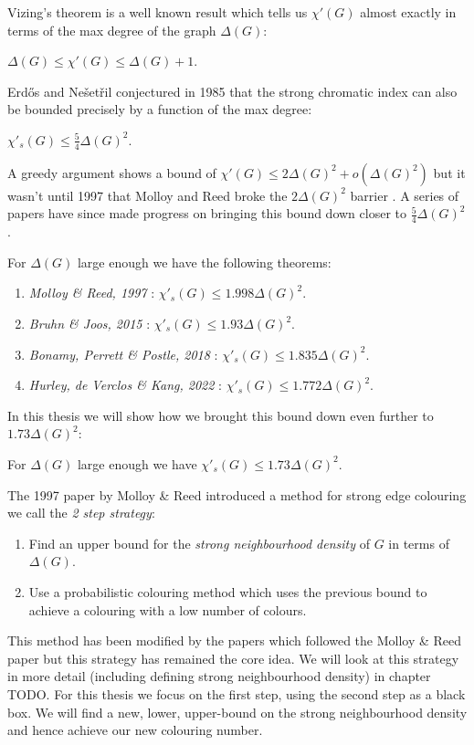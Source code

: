 Vizing's theorem is a well known result which tells us $\chi'(G)$ almost exactly in terms of
the max degree of the graph $\Delta(G)$:
\begin{knowntheorem}
    $\Delta(G) \leq \chi'(G) \leq \Delta(G) + 1$.
\end{knowntheorem}
Erd\H{o}s and Nešetřil conjectured in 1985 that
the strong chromatic index can also be bounded precisely by a function of the max degree:
\begin{knownconjecture}
    \label{conj:intro_erdos_nesetril}
    $\chi'_s(G) \leq \frac{5}{4}\Delta(G)^2$.
\end{knownconjecture}
A greedy argument shows a bound of $\chi'(G) \leq 2\Delta(G)^2 + o(\Delta(G)^2)$ but it wasn't until
1997 that Molloy and Reed broke the $2\Delta(G)^2$ barrier \cite{molloyBoundStrongChromatic1997}.
A series of papers have since made progress on bringing this bound down closer to $\frac{5}{4}\Delta(G)^2$.

For $\Delta(G)$ large enough we have the following theorems:
\begin{enumerate}
  \item \textit{Molloy \& Reed, 1997} \cite{molloyBoundStrongChromatic1997}:
        $\chi'_s(G) \leq 1.998\Delta(G)^2$.
  \item \textit{Bruhn \& Joos, 2015} \cite{bruhnStrongerBoundStrong2018}:
        $\chi'_s(G) \leq 1.93\Delta(G)^2$.
  \item \textit{Bonamy, Perrett \& Postle, 2018} \cite{bonamyColouringGraphsSparse2018}:
        $\chi'_s(G) \leq 1.835\Delta(G)^2$.
  \item \textit{Hurley, de Verclos \& Kang, 2022} \cite{hurleyImprovedProcedureColouring2022}:
        $\chi'_s(G) \leq 1.772\Delta(G)^2$.
\end{enumerate}

In this thesis we will show how we brought this bound down even further to $1.73\Delta(G)^2$:
\begin{knowntheorem}
    For $\Delta(G)$ large enough we have
    $\chi'_s(G) \leq 1.73\Delta(G)^2$.
\end{knowntheorem}

The 1997 paper by Molloy \& Reed introduced a method for strong edge colouring we call the
\textit{2 step strategy}:
\begin{enumerate}
    \item Find an upper bound for the \textit{strong neighbourhood density} of $G$ in terms of
        $\Delta(G)$.
    \item Use a probabilistic colouring method which uses the previous bound to achieve a colouring
        with a low number of colours.
\end{enumerate}
This method has been modified by the papers which followed the Molloy \& Reed paper but this
strategy has remained the core idea. We will look at this strategy in more detail (including
defining strong neighbourhood density) in chapter TODO.
For this thesis we focus on the first step, using the second step as a black box. We will
find a new, lower, upper-bound on the strong neighbourhood density and hence achieve our
new colouring number.

